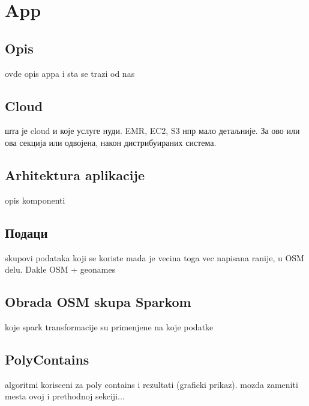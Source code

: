 \documentclass[12pt,oneside]{memoir}
\begin{document}

\chapter{App}
\label{chp:app}

\section{Opis}
\label{sec:opis}

ovde opis appa i sta se trazi od nas

\section{Cloud}
\label{sec:cloud}

шта је cloud и које услуге нуди. EMR, EC2, S3 нпр мало детаљније. За ово или ова секција или одвојена, након дистрибуираних система.

\section{Arhitektura aplikacije}
\label{sec:app_aphi}

opis komponenti

\section{Подаци}
\label{sec:osm_spark_podaci}

skupovi podataka koji se koriste mada je vecina toga vec napisana ranije, u OSM delu. Dakle OSM + geonames

\section{Obrada OSM skupa Sparkom}
\label{sec:osm_spark_obrada}

koje spark transformacije su primenjene na koje podatke

\section{PolyContains}
\label{sec:poly_cont}

algoritmi korisceni za poly contains i rezultati (graficki prikaz). mozda zameniti mesta ovoj i prethodnoj sekciji...
\end{document}
